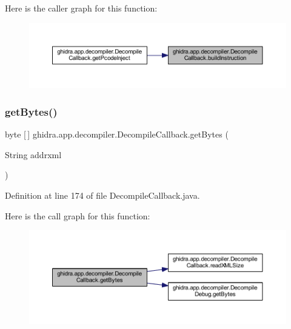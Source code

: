 Here is the caller graph for this function\+:
\nopagebreak
\begin{figure}[H]
\begin{center}
\leavevmode
\includegraphics[width=350pt]{classghidra_1_1app_1_1decompiler_1_1_decompile_callback_a4551fa26e2b4264540bcbe680d87c2a7_icgraph}
\end{center}
\end{figure}
\mbox{\label{classghidra_1_1app_1_1decompiler_1_1_decompile_callback_a28f31a524530fe44cec49ca2d1c91b08}} 
\subsubsection{\texorpdfstring{getBytes()}{getBytes()}}
{\footnotesize\ttfamily byte \mbox{[}$\,$\mbox{]} ghidra.\+app.\+decompiler.\+Decompile\+Callback.\+get\+Bytes (\begin{DoxyParamCaption}\item[{String}]{addrxml }\end{DoxyParamCaption})\hspace{0.3cm}{\ttfamily [inline]}}



Definition at line 174 of file Decompile\+Callback.\+java.

Here is the call graph for this function\+:
\nopagebreak
\begin{figure}[H]
\begin{center}
\leavevmode
\includegraphics[width=350pt]{classghidra_1_1app_1_1decompiler_1_1_decompile_callback_a28f31a524530fe44cec49ca2d1c91b08_cgraph}
\end{center}
\end{figure}
\mbox{\label{classghidra_1_1app_1_1decompiler_1_1_decompile_callback_a4d424166efdabe663d16e4cd27e76db3}} 
